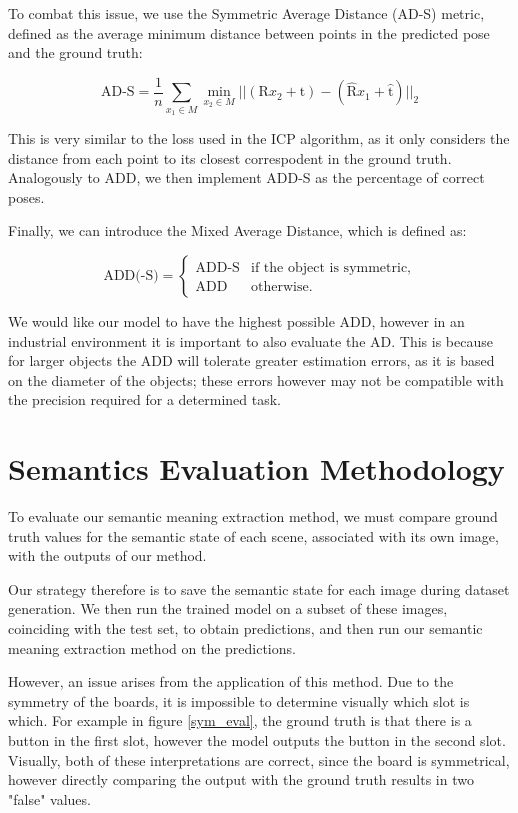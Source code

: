 To combat this issue, we use the Symmetric Average Distance (AD-S)\cite{PoseCNN} metric, defined as the average minimum distance between points in the predicted pose and the ground truth:

\begin{equation*}
    \text{AD-S} = \frac{1}{n} \sum_{x_1 \in M} \min_{x_2 \in M} ||(\text{R}x_2 + \text{t}) - 
    (\hat{\text{R}}x_1 + \hat{\text{t}})||_2
\end{equation*}

This is very similar to the loss used in the ICP algorithm, as it only considers the distance from each point to its closest correspodent in the ground truth. Analogously to ADD, we then implement ADD-S as the percentage of correct poses.

Finally, we can introduce the Mixed Average Distance, which is defined as:

\begin{equation*}
    \text{ADD(-S)} = 
    \begin{cases}
        \text{ADD-S} & \text{if the object is symmetric,}\\
        \text{ADD} & \text{otherwise.}
    \end{cases}
\end{equation*}

We would like our model to have the highest possible ADD, however in an industrial environment it is important to also evaluate the AD. This is because for larger objects the ADD will tolerate greater estimation errors, as it is based on the diameter of the objects; these errors however may not be compatible with the precision required for a determined task.

\section{Semantics Evaluation Methodology}
\label{semantics_method_section}

To evaluate our semantic meaning extraction method, we must compare ground truth values for the semantic state of each scene, associated with its own image, with the outputs of our method.

Our strategy therefore is to save the semantic state for each image during dataset generation. We then run the trained model on a subset of these images, coinciding with the test set, to obtain predictions, and then run our semantic meaning extraction method on the predictions.

However, an issue arises from the application of this method. Due to the symmetry of the boards, it is impossible to determine visually which slot is which. For example in figure \ref{sym_eval}, the ground truth is that there is a button in the first slot, however the model outputs the button in the second slot. Visually, both of these interpretations are correct, since the board is symmetrical, however directly comparing the output with the ground truth results in two "false" values.

